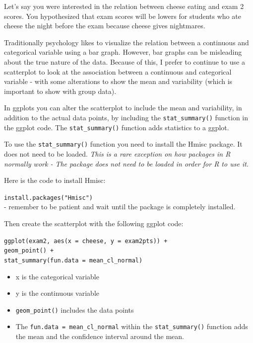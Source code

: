 \documentclass[
]{book}
\providecommand{\tightlist}{%
  \setlength{\itemsep}{0pt}\setlength{\parskip}{0pt}}
\begin{document}
Let's say you were interested in the relation between cheese eating and exam 2 scores. You hypothesized that exam scores will be lowers for students who ate cheese the night before the exam because cheese gives nightmares.

Traditionally psychology likes to visualize the relation between a continuous and categorical variable using a bar graph. However, bar graphs can be misleading about the true nature of the data. Because of this, I prefer to continue to use a scatterplot to look at the association between a continuous and categorical variable - with some alterations to show the mean and variability (which is important to show with group data).

In ggplots you can alter the scatterplot to include the mean and variability, in addition to the actual data points, by including the \texttt{stat\_summary()} function in the ggplot code. The \texttt{stat\_summary()} function adds statistics to a ggplot.

To use the \texttt{stat\_summary()} function you need to install the Hmisc package. It does not need to be loaded. \emph{This is a rare exception on how packages in R normally work - The package does not need to be loaded in order for R to use it.}

Here is the code to install Hmisc:

\texttt{install.packages("Hmisc")}\\
- remember to be patient and wait until the package is completely installed.

Then create the scatterplot with the following ggplot code:

\texttt{ggplot(exam2,\ aes(x\ =\ cheese,\ y\ =\ exam2pts))\ +}\\
\texttt{geom\_point()\ +}~\\
\texttt{stat\_summary(fun.data\ =\ mean\_cl\_normal)}

\begin{itemize}
\tightlist
\item
  x is the categorical variable\\
\item
  y is the continuous variable\\
\item
  \texttt{geom\_point()} includes the data points\\
\item
  The \texttt{fun.data\ =\ mean\_cl\_normal} within the \texttt{stat\_summary()} function adds the mean and the confidence interval around the mean.
\end{itemize}
\end{document}
